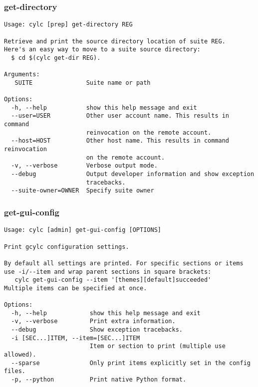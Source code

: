\subsubsection{get-directory}
\label{get-directory}
\begin{lstlisting}
Usage: cylc [prep] get-directory REG

Retrieve and print the source directory location of suite REG.
Here's an easy way to move to a suite source directory:
  $ cd $(cylc get-dir REG).

Arguments:
   SUITE               Suite name or path

Options:
  -h, --help           show this help message and exit
  --user=USER          Other user account name. This results in command
                       reinvocation on the remote account.
  --host=HOST          Other host name. This results in command reinvocation
                       on the remote account.
  -v, --verbose        Verbose output mode.
  --debug              Output developer information and show exception
                       tracebacks.
  --suite-owner=OWNER  Specify suite owner
\end{lstlisting}
\subsubsection{get-gui-config}
\label{get-gui-config}
\begin{lstlisting}
Usage: cylc [admin] get-gui-config [OPTIONS]

Print gcylc configuration settings.

By default all settings are printed. For specific sections or items
use -i/--item and wrap parent sections in square brackets:
   cylc get-gui-config --item '[themes][default]succeeded'
Multiple items can be specified at once.

Options:
  -h, --help            show this help message and exit
  -v, --verbose         Print extra information.
  --debug               Show exception tracebacks.
  -i [SEC...]ITEM, --item=[SEC...]ITEM
                        Item or section to print (multiple use allowed).
  --sparse              Only print items explicitly set in the config files.
  -p, --python          Print native Python format.
\end{lstlisting}
